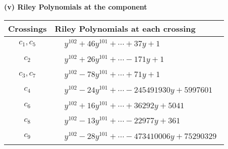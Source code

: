 \documentclass[1p]{elsarticle_modified}
\theoremstyle{definition}
\begin{document}
\newpage\renewcommand{\arraystretch}{1}
\flushleft \textbf{(v) Riley Polynomials at the component}\newline \\
\begin{tabular}{m{50pt}|m{274pt}}
Crossings & \hspace{64pt}Riley Polynomials at each crossing \\
\hline $$\begin{aligned}c_{1},c_{5}\end{aligned}$$&$\begin{aligned}
&y^{102}+46 y^{101}+\cdots+37 y+1
\end{aligned}$\\
\hline $$\begin{aligned}c_{2}\end{aligned}$$&$\begin{aligned}
&y^{102}+26 y^{101}+\cdots-171 y+1
\end{aligned}$\\
\hline $$\begin{aligned}c_{3},c_{7}\end{aligned}$$&$\begin{aligned}
&y^{102}-78 y^{101}+\cdots+71 y+1
\end{aligned}$\\
\hline $$\begin{aligned}c_{4}\end{aligned}$$&$\begin{aligned}
&y^{102}-24 y^{101}+\cdots-245491930 y+5997601
\end{aligned}$\\
\hline $$\begin{aligned}c_{6}\end{aligned}$$&$\begin{aligned}
&y^{102}+16 y^{101}+\cdots+36292 y+5041
\end{aligned}$\\
\hline $$\begin{aligned}c_{8}\end{aligned}$$&$\begin{aligned}
&y^{102}-13 y^{101}+\cdots-22977 y+361
\end{aligned}$\\
\hline $$\begin{aligned}c_{9}\end{aligned}$$&$\begin{aligned}
&y^{102}-28 y^{101}+\cdots-473410006 y+75290329
\end{aligned}$\\

\end{tabular}
\end{document}

